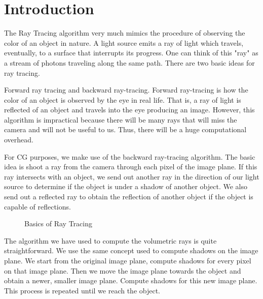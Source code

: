 \documentclass[paper=a4, fontsize=11pt]{scrartcl}
\numberwithin{equation}{section}		%
\numberwithin{figure}{section}			%
\numberwithin{table}{section}				%
\begin{document}
\section{Introduction}
The Ray Tracing algorithm very much mimics the procedure of observing the color of an object in nature. A light source emits a ray of light which travels, eventually, to a surface that interrupts its progress. One can think of this "ray" as a stream of photons traveling along the same path. There are two basic ideas for ray tracing.
\par
Forward ray tracing and backward ray-tracing. Forward ray-tracing is how the color of an object is observed by the eye in real life. That is, a ray of light is reflected of an object and travels into the eye producing an image. However, this algorithm is impractical because there will be many rays that will miss the camera and will not be useful to us. Thus, there will be a huge computational overhead. 
\par
For CG purposes, we make use of the backward ray-tracing algorithm. The basic idea is shoot a ray from the camera through each pixel of the image plane. If this ray intersects with an object, we send out another ray in the direction of our light source to determine if the object is under a shadow of another object. We also send out a reflected ray to obtain the reflection of another object if the object is capable of reflections.
\vspace{20pt}
\begin{figure}[h]
\centering
{}
\caption{Basics of Ray Tracing}
\end{figure}
\newpage
The algorithm we have used to compute the volumetric rays is quite straightforward. We use the same concept used to compute shadows on the image plane. We start from the original image plane, compute shadows for every pixel on that image plane. Then we move the image plane towards the object and obtain a newer, smaller image plane. Compute shadows for this new image plane. This process is repeated until we reach the object.
\end{document}
